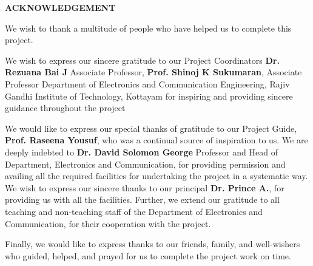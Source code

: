 \begin{center}

    \vspace{6pt}
    {\LARGE \bfseries ACKNOWLEDGEMENT}
    \vspace{20pt}

    \begin{minipage} {0.9\textwidth}

        \setlength{\parindent}{10pt}
        \setlength{\parskip}{\baselineskip}

        We wish to thank a multitude of people who have helped us to complete this project.


        We wish to express our sincere gratitude to our Project Coordinators \textbf{Dr. Rezuana Bai J}
        Associate Professor, \textbf{Prof. Shinoj K Sukumaran}, Associate Professor Department of Electronics
        and Communication Engineering, Rajiv Gandhi Institute of Technology, Kottayam
        for inspiring and providing sincere guidance throughout the project


        We would like to express our special thanks of gratitude to our Project Guide,
        \textbf{Prof. Raseena Yousuf}, who was a continual source of inspiration to us. We are
        deeply indebted to \textbf{Dr. David Solomon George} Professor and Head of Department,
        Electronics and Communication, for providing permission and availing all the required
        facilities for undertaking the project in a systematic way. We wish to express our sincere
        thanks to our principal \textbf{Dr. Prince A.}, for providing us with all the facilities. Further,
        we extend our gratitude to all teaching and non-teaching staff of the Department of Electronics
        and Communication, for their cooperation with the project.


        Finally, we would like to express thanks to our friends, family, and well-wishers who
        guided, helped, and prayed for us to complete the project work on time.

    \end{minipage}

\end{center}

\pagebreak
